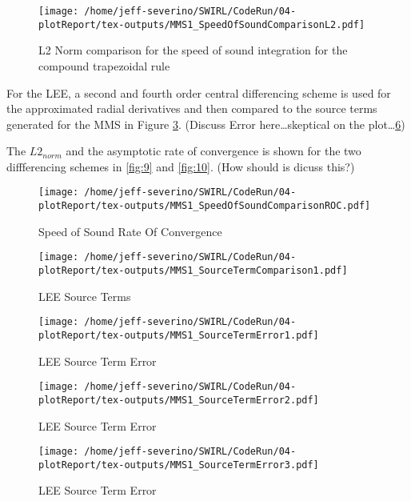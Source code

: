\begin{figure}[!]
    \centering
    \texttt{[image: /home/jeff-severino/SWIRL/CodeRun/04-plotReport/tex-outputs/MMS1\_SpeedOfSoundComparisonL2.pdf]}
    \caption{L2 Norm comparison for the speed of sound integration for the compound trapezoidal rule}
    \label{fig:8}
\end{figure}



For the LEE, a second and fourth order central differencing scheme is used
for the approximated radial derivatives and then compared to the source terms 
generated for the MMS in Figure \ref{fig:6}. (Discuss Error here\dots skeptical 
on the plot\dots \ref{fig:7})

The $L2_{norm}$ and the  asymptotic rate of convergence is shown for the 
two diffferencing schemes in  \ref{fig:9} and \ref{fig:10}. (How should is dicuss this?) 

\begin{figure}[!]
    \centering
    \texttt{[image: /home/jeff-severino/SWIRL/CodeRun/04-plotReport/tex-outputs/MMS1\_SpeedOfSoundComparisonROC.pdf]}
    \caption{ Speed of Sound Rate Of Convergence}
    \label{fig:SpeedOfSoundROC}
\end{figure}



\begin{figure}[!]
    \centering
    \texttt{[image: /home/jeff-severino/SWIRL/CodeRun/04-plotReport/tex-outputs/MMS1\_SourceTermComparison1.pdf]}
    \caption{LEE Source Terms}
    \label{fig:6}
\end{figure}


\begin{figure}[!]
    \centering
    \texttt{[image: /home/jeff-severino/SWIRL/CodeRun/04-plotReport/tex-outputs/MMS1\_SourceTermError1.pdf]}
    \caption{LEE Source Term Error}
    \label{fig:7}
\end{figure}


\begin{figure}[!]
    \centering
    \texttt{[image: /home/jeff-severino/SWIRL/CodeRun/04-plotReport/tex-outputs/MMS1\_SourceTermError2.pdf]}
    \caption{LEE Source Term Error}
    \label{fig:7}
\end{figure}


\begin{figure}[!]
    \centering
    \texttt{[image: /home/jeff-severino/SWIRL/CodeRun/04-plotReport/tex-outputs/MMS1\_SourceTermError3.pdf]}
    \caption{LEE Source Term Error}
    \label{fig:7}
\end{figure}


